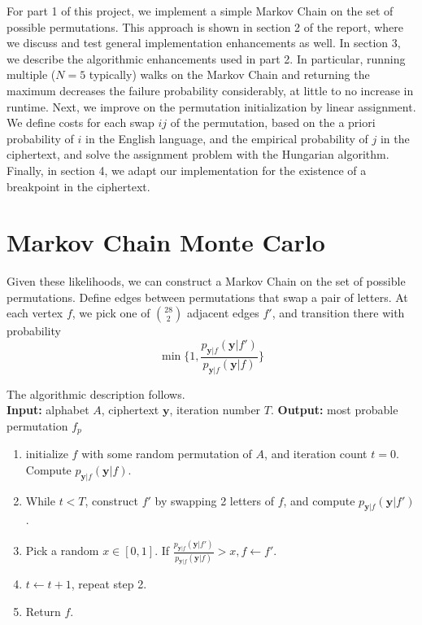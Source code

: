 \documentclass[aps,prd,final,twocolumn,letterpaper]{revtex4}
\begin{document}
For part 1 of this project, we implement a simple Markov Chain on the set of possible permutations. This approach is shown in section 2 of the report, where we discuss and test general implementation enhancements as well. In section 3, we describe the algorithmic enhancements used in part 2. In particular, running multiple ($N = 5$ typically) walks on the Markov Chain and returning the maximum decreases the failure probability considerably, at little to no increase in runtime. Next, we improve on the permutation initialization by linear assignment. We define costs for each swap $ij$ of the permutation, based on the a priori probability of $i$ in the English language, and the empirical probability of $j$ in the ciphertext, and solve the assignment problem with the Hungarian algorithm. Finally, in section 4, we adapt our implementation for the existence of a breakpoint in the ciphertext.


\section{Markov Chain Monte Carlo}
Given these likelihoods, we can construct a Markov Chain on the set of possible permutations. Define edges between permutations that swap a pair of letters. At each vertex $f$, we pick one of $\binom{28}{2}$ adjacent edges $f'$, and transition there with probability
\begin{equation}
\min\{1, \frac{p_{\mathbf{y}|f}(\mathbf{y}|f')}{p_{\mathbf{y}|f}(\mathbf{y}|f)}\}
\end{equation}

The algorithmic description follows.\\

\noindent \textbf{Input:} alphabet $A$, ciphertext $\mathbf{y}$, iteration number $T$.
\noindent\textbf{Output:} most probable permutation $f_p$



\begin{enumerate}
\item initialize $f$ with some random permutation of $A$, and iteration count $t=0$. Compute $p_{\mathbf{y}|f}(\mathbf{y}|f)$.
\item While $t<T$, construct $f'$ by swapping 2 letters of $f$, and compute $p_{\mathbf{y}|f}(\mathbf{y}|f')$.
\item Pick a random $x\in [0, 1]$. If $\frac{p_{\mathbf{y}|f}(\mathbf{y}|f')}{p_{\mathbf{y}|f}(\mathbf{y}|f)}> x, f\leftarrow f'$.
\item $t\leftarrow t + 1$, repeat step 2.
\item Return $f$.
\end{enumerate}
\end{document}
